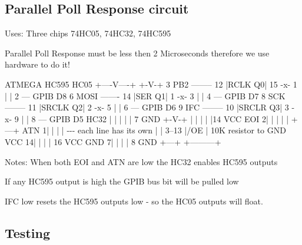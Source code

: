 \begin{DoxyItemize}
\end{DoxyItemize}





\subsection*{Parallel Poll Response circuit}


\begin{DoxyItemize}
\item Uses\+: Three chips 74\+H\+C05, 74\+H\+C32, 74\+H\+C595
\item Parallel Poll Response must be less then 2 Microseconds therefore we use hardware to do it!
\end{DoxyItemize}


\begin{DoxyPre}
    ATMEGA               HC595             HC05 
                      +----V----+          +-V-+  
    3 PB2 -------- 12 |RCLK   Q0| 15 -x- 1 |   | 2 --- GPIB D8 
    6 MOSI ------- 14 |SER    Q1| 1  -x- 3 |   | 4 --- GPIB D7 
    8 SCK -------- 11 |SRCLK  Q2| 2  -x- 5 |   | 6 --- GPIB D6 
    9 IFC -------- 10 |SRCLR  Q3| 3  -x- 9 |   | 8 --- GPIB D5 
           HC32       |         |     |    |   | 7 GND 
          +-V-+       |         |     |    |   |14 VCC 
     EOI 2|   |       |         |     |    +---+ 
     ATN 1|   |       |         |     -\/-\/-\/ each line has its own 
          |   | 3--13 |/OE      |          10K resistor to GND 
    VCC 14|   |       |         | 16 VCC 
    GND  7|   |       |         |  8 GND 
          +---+       +---------+ 
\end{DoxyPre}


Notes\+: When both E\+OI and A\+TN are low the H\+C32 enables H\+C595 outputs
\begin{DoxyItemize}
\item If any H\+C595 output is high the G\+P\+IB bus bit will be pulled low
\item I\+FC low resets the H\+C595 outputs low -\/ so the H\+C05 outputs will float.
\end{DoxyItemize}





\subsection*{Testing}


